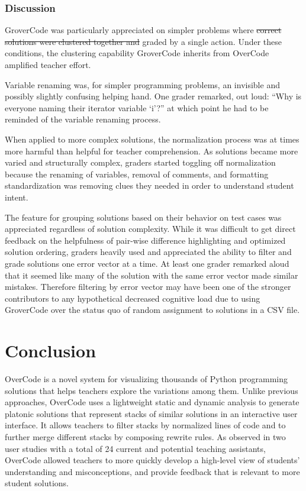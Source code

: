 \documentclass[12pt,twoside]{mitthesis}
\providecommand{\DIFaddtex}[1]{{\protect\color{blue}\uwave{#1}}} %
\providecommand{\DIFdeltex}[1]{{\protect\color{red}\sout{#1}}}                      %
\providecommand{\DIFaddbegin}{} %
\providecommand{\DIFaddend}{} %
\providecommand{\DIFdelbegin}{} %
\providecommand{\DIFdelend}{} %
\providecommand{\DIFadd}[1]{\texorpdfstring{\DIFaddtex{#1}}{#1}} %
\providecommand{\DIFdel}[1]{\texorpdfstring{\DIFdeltex{#1}}{}} %
\begin{document}
\subsubsection{Discussion}

GroverCode was particularly appreciated on simpler problems where \DIFdelbegin \DIFdel{correct solutions were clustered together and }\DIFdelend \DIFaddbegin \DIFadd{GroverCode clustered correct solutions together to be }\DIFaddend graded by a single action. Under these conditions, the clustering capability GroverCode inherits from OverCode amplified teacher effort.

Variable renaming was, for simpler programming problems, an invisible and possibly slightly confusing helping hand. One grader remarked, out loud: ``Why is everyone naming their iterator variable `i'?'' at which point he had to be reminded of the variable renaming process. 

When applied to more complex solutions, the normalization process was at times more harmful than helpful for teacher comprehension. As solutions became more varied and structurally complex, graders started toggling off normalization because the renaming of variables, removal of comments, and formatting standardization was removing clues they needed in order to understand student intent.

The feature for grouping solutions based on their behavior on test cases was appreciated regardless of solution complexity. While it was difficult to get direct feedback on the helpfulness of pair-wise difference highlighting and optimized solution ordering, graders heavily used and appreciated the ability to filter and grade solutions one error vector at a time. At least one grader remarked aloud that it seemed like many of the solution with the same error vector made similar mistakes. Therefore filtering by error vector may have been one of the stronger contributors to any hypothetical decreased cognitive load due to using GroverCode over the status quo of random assignment to solutions in a CSV file.


\section{Conclusion}
OverCode is a novel system for visualizing thousands of Python programming solutions that helps teachers explore the variations among them. Unlike previous approaches, OverCode uses a lightweight static and dynamic analysis to generate platonic solutions that represent stacks of similar solutions in an interactive user interface. It allows teachers to filter stacks by normalized lines of code and to further merge different stacks by composing rewrite rules. As observed in two user studies with a total of 24 current and potential teaching assistants, OverCode allowed teachers to more quickly develop a high-level view of students' understanding and misconceptions, and provide feedback that is relevant to more student solutions. 
\end{document}
